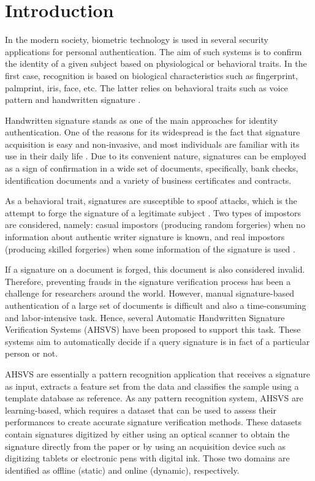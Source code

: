 
\chapter{Introduction}
In the modern society, biometric technology is used in several security applications for personal authentication. The aim of such systems is to confirm the identity of a given subject based on physiological or behavioral traits. In the first case, recognition is based on biological characteristics such as fingerprint, palmprint, iris, face, etc. The latter relies on behavioral traits such as voice pattern and handwritten signature \cite{jain2004biometrics}.

Handwritten signature stands as one of the main approaches for identity authentication. One of the reasons for its widespread is the fact that signature acquisition is easy and non-invasive, and most individuals are familiar with its use in their daily life \cite{impedovo2008state}. Due to its convenient nature, signatures can be employed as a sign of confirmation in a wide set of documents, specifically, bank checks, identification documents and a variety of business certificates and contracts.

As a behavioral trait, signatures are susceptible to spoof attacks, which is the attempt to forge the signature of a legitimate subject \cite{jain2004biometrics}. Two types of impostors are considered, namely: casual impostors (producing random forgeries) when no information about authentic writer signature is known, and real impostors (producing skilled forgeries) when some information of the signature is used \cite{fierrez2008handbook}.

If a signature on a document is forged, this document is also considered invalid. Therefore, preventing frauds in the signature verification process has been a challenge for researchers around the world. However, manual signature-based authentication of a large set of documents is difficult and also a time-consuming and labor-intensive task. Hence, several Automatic Handwritten Signature Verification Systems (AHSVS) have been proposed to support this task. These systems aim to automatically decide if a query signature is in fact of a particular person or not.

AHSVS are essentially a pattern recognition application that receives a signature as input, extracts a feature set from the data and classifies the sample using a template database as reference. As any pattern recognition system, AHSVS are learning-based, which requires a dataset that can be used to assess their performances to create accurate signature verification methods. These datasets contain signatures digitized by either using an optical scanner to obtain the signature directly from the paper or by using an acquisition device such as digitizing tablets or electronic pens with digital ink. Those two domains are identified as offline (static) and online (dynamic), respectively. 

